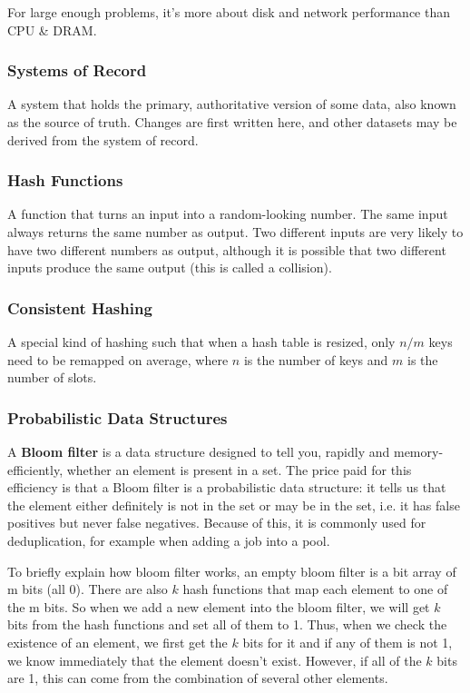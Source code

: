 \documentclass{article}
\begin{document}
    For large enough problems, it’s more about disk and network performance than CPU \& DRAM.
    
    \subsubsection{Systems of Record}
    A system that holds the primary, authoritative version of some data, also known as  the source of truth. Changes are first written here, and other datasets may be derived from the system of record.
    
    \subsubsection{Hash Functions}
    A function that turns an input into a random-looking number. The same input always returns the same number as output. Two different inputs are very likely to have two different numbers as output,  although it is possible that two different inputs produce the same output (this is called a collision).
    
    \subsubsection{Consistent Hashing}
    A special kind of hashing such that when a hash table is resized, only $n/m$ keys need to be remapped on average, where $n$ is the number of keys and $m$ is the number of slots.
    
    \subsubsection{Probabilistic Data Structures}
    A \textbf{Bloom filter} is a data structure designed to tell you, rapidly and memory-efficiently, whether an element is present in a set. The price paid for this efficiency is that a Bloom filter is a probabilistic data structure: it tells us that the element either definitely is not in the set or may be in the set, i.e. it has false positives but never false negatives. Because of this, it is commonly used for deduplication, for example when adding a job into a pool.
    
    To briefly explain how bloom filter works, an empty bloom filter is a bit array of m bits (all 0). There are also $k$ hash functions that map each element to one of the m bits. So when we add a new element into the bloom filter, we will get $k$ bits from the hash functions and set all of them to 1. Thus, when we check the existence of an element, we first get the $k$ bits for it and if any of them is not 1, we know immediately that the element doesn't exist. However, if all of the $k$ bits are 1, this can come from the combination of several other elements.
    
\end{document}

